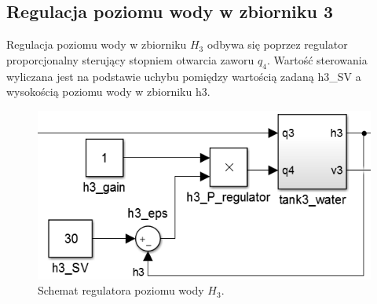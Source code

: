 \subsection{Regulacja poziomu wody w zbiorniku 3}
\indent Regulacja poziomu wody w zbiorniku $H_{3}$ odbywa się poprzez regulator proporcjonalny sterujący stopniem otwarcia zaworu $q_{4}$. Wartość sterowania wyliczana jest na podstawie uchybu pomiędzy wartością zadaną {h3\_SV} a wysokością poziomu wody w zbiorniku h3.
\begin{figure}[H]
	\centering
	\includegraphics[scale = 0.4]{fig/h3_regulator.png}
	\caption{Schemat regulatora poziomu wody $H_{3}$.}
	\label{fig:h3reg}
\end{figure}
